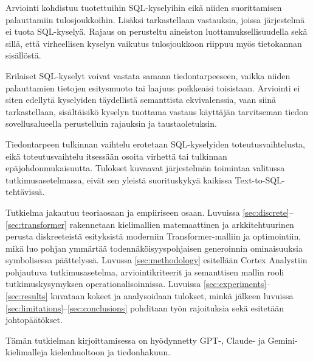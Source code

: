 Arviointi kohdistuu tuotettuihin SQL-kyselyihin eikä niiden
suorittamisen palauttamiin tulosjoukkoihin. Lisäksi tarkastellaan
vastauksia, joissa järjestelmä ei tuota SQL-kyselyä. Rajaus on
perusteltu aineiston luottamuksellisuudella sekä sillä, että
virheellisen kyselyn vaikutus tulosjoukkoon riippuu myös tietokannan
sisällöstä.

Erilaiset SQL-kyselyt voivat vastata samaan
tiedontarpeeseen, vaikka niiden palauttamien tietojen esitysmuoto
tai laajuus poikkeaisi toisistaan. Arviointi ei siten edellytä
kyselyiden täydellistä semanttista ekvivalenssia, vaan siinä
tarkastellaan, sisältäisikö kyselyn tuottama vastaus käyttäjän
tarvitseman tiedon sovellusalueella perustelluin rajauksin ja
taustaoletuksin.

Tiedontarpeen tulkinnan vaihtelu erotetaan
SQL-kyselyiden toteutusvaihtelusta, eikä toteutusvaihtelu itsessään
osoita virhettä tai tulkinnan epäjohdonmukaisuutta. Tulokset kuvaavat
järjestelmän toimintaa valitussa tutkimusasetelmassa, eivät sen
yleistä suorituskykyä kaikissa Text-to-SQL-tehtävissä.

Tutkielma jakautuu teoriaosaan ja empiiriseen osaan. Luvuissa \ref{sec:discrete}--\ref{sec:transformer} rakennetaan kielimallien matemaattinen ja arkkitehtuurinen perusta diskreeteistä esityksistä moderniin Transformer-malliin ja optimointiin, mikä luo pohjan ymmärtää todennäköisyyspohjaisen generoinnin ominaisuuksia symbolisessa päättelyssä. Luvussa \ref{sec:methodology} esitellään Cortex Analystiin pohjautuva tutkimusasetelma, arviointikriteerit ja semanttisen mallin rooli tutkimuskysymyksen operationalisoinnissa. Luvuissa \ref{sec:experiments}--\ref{sec:results} kuvataan kokeet ja analysoidaan tulokset, minkä jälkeen luvuissa \ref{sec:limitations}--\ref{sec:conclusions} pohditaan työn rajoituksia sekä esitetään johtopäätökset.

Tämän tutkielman kirjoittamisessa on hyödynnetty GPT-, Claude- ja Gemini-kielimalleja kielenhuoltoon ja tiedonhakuun.
